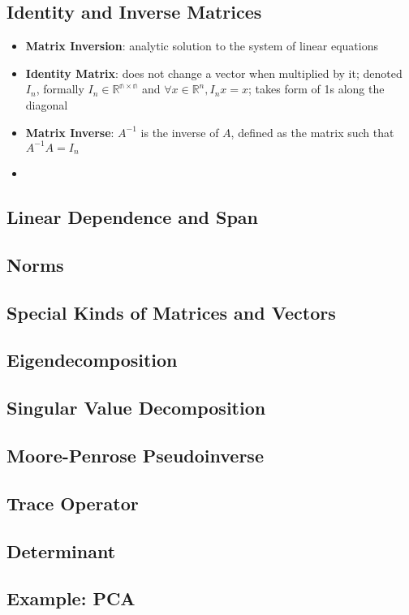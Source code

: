 \subsection{Identity and Inverse Matrices}
\begin{itemize}
    \item \textbf{Matrix Inversion}: analytic solution to the system of linear equations
    \item \textbf{Identity Matrix}: does not change a vector when multiplied by it; denoted $I_n$, formally $I_n \in \mathbb{R^{n \times n}}$ and $\forall x \in \mathbb{R}^n, I_n x = x$; takes form of 1s along the diagonal
    \item \textbf{Matrix Inverse}: $A^{-1}$ is the inverse of $A$, defined as the matrix such that $A^{-1}A = I_n$
    \item 
\end{itemize}

\subsection{Linear Dependence and Span}

\subsection{Norms}

\subsection{Special Kinds of Matrices and Vectors}

\subsection{Eigendecomposition}

\subsection{Singular Value Decomposition}

\subsection{Moore-Penrose Pseudoinverse}

\subsection{Trace Operator}

\subsection{Determinant}

\subsection{Example: PCA}

